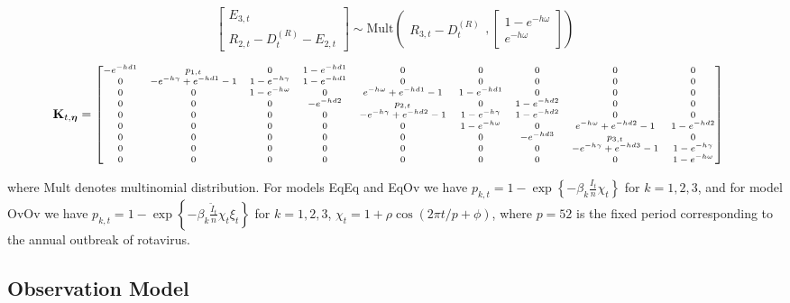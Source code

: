 \documentclass[10pt]{article}
\begin{document}
\[
\left[ \begin{array}{c}
    E_{3,t} \\
    R_{2,t} - D_{t}^{(R)}- E_{2,t}
\end{array} \right]
\sim \text{Mult} 
\left( \begin{array}{c}
    R_{3,t} - D_{t}^{(R)}
\end{array}, \left[ \begin{array}{c}
    1 - e^{-h\omega} \\
    e^{-h\omega}
\end{array} \right] \right)
\]


\[
\begin{aligned}
    \mathbf{K}_{t, \bm{\eta}} &= \scriptsize{
    \begin{bmatrix}
    -e^{-hd1} & p_{1,t} & 0 & 1 - e^{-hd1} & 0 & 0 & 0 & 0 & 0 \\
    0 & -e^{-h\gamma} + e^{-hd1} - 1 & 1 - e^{-h\gamma} & 1 - e^{-hd1} & 0 & 0 & 0 & 0 & 0 \\
    0 & 0 & 1 - e^{-h\omega} & 0 & e^{-h\omega} + e^{-hd1} - 1 & 1 - e^{-hd1} & 0 & 0 & 0 \\
    0 & 0 & 0 & -e^{-hd2} & p_{2,t} & 0 & 1 - e^{-hd2} & 0 & 0 \\
    0 & 0 & 0 & 0 & -e^{-h\gamma} + e^{-hd2} - 1 & 1 - e^{-h\gamma} & 1 - e^{-hd2} & 0 & 0 \\
    0 & 0 & 0 & 0 & 0 & 1 - e^{-h\omega} & 0 & e^{-h\omega} + e^{-hd2} - 1 & 1 - e^{-hd2} \\
    0 & 0 & 0 & 0 & 0 & 0 & -e^{-hd3} & p_{3,t} & 0 \\
    0 & 0 & 0 & 0 & 0 & 0 & 0 & -e^{-h\gamma} + e^{-hd3} - 1 & 1 - e^{-h\gamma} \\
    0 & 0 & 0 & 0 & 0 & 0 & 0 & 0 & 1 - e^{-h\omega} \\
    \end{bmatrix}
    }
\end{aligned}
\]

where Mult denotes multinomial distribution. For models EqEq and EqOv we have \( p_{k,t} = 1 - \exp \left\{-\beta_k \frac{I_t}{n} \chi_t \right\} \) for \( k = 1, 2, 3 \), and for model OvOv we have \( p_{k,t} = 1 - \exp \left\{-\beta_k \frac{\tilde{I}_t}{n} \chi_t \xi_t \right\} \) for \( k = 1, 2, 3 \), \( \chi_t = 1+\rho \cos({2\pi t/p + \phi}) \), where $p=52$ is the fixed period corresponding to the annual outbreak of rotavirus.

\subsection{Observation Model}\label{observationmodel}
\end{document}
